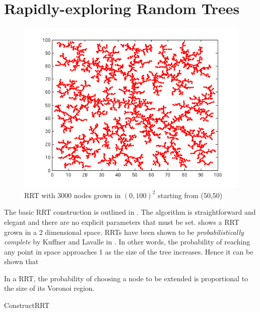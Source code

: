 \documentclass[wcp]{jmlr}
\begin{document}
\section{Rapidly-exploring Random Trees}
\label{sec:rrt}
\begin{figure}[htb]
\centering
\label{fig:rrt}
\includegraphics[scale=0.4]{rrt.png}
\caption{RRT with 3000 nodes grown in $(0,100)^2$ starting from (50,50)}
\end{figure}

The basic RRT construction is outlined in . The algorithm is straightforward and elegant and there are no explicit parameters that must be set.  shows a RRT grown in a 2 dimensional space. RRTs have been shown to be \textit{probabilistically complete} by Kuffner and Lavalle in \citep{rrtconnect}. In other words, the probability of reaching any point in space approaches 1 as the size of the tree increases. Hence it can be shown that 
\begin{lemma}\label{thm:rrt1}
In a RRT, the probability of choosing a node to be extended is proportional to the size of its Voronoi region.
\end{lemma}


\begin{algorithm2e}
\caption{ConstructRRT}
\label{alg:basicrrt}
\dontprintsemicolon
{}
\end{algorithm2e}
\end{document}
